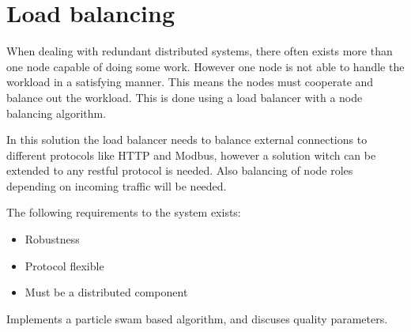 \chapter{Load balancing}

When dealing with redundant distributed systems, there often exists more than one node capable of doing some work.
However one node is not able to handle the workload in a satisfying manner.
This means the nodes must cooperate and balance out the workload.
This is done using a load balancer with a node balancing algorithm.

In this solution the load balancer needs to balance external connections to different protocols like HTTP and Modbus, however a solution witch can be extended to any restful protocol is needed. Also balancing of node roles depending on incoming traffic will be needed.


The following requirements to the system exists:
\begin{itemize}
	\item Robustness
	\item Protocol flexible
	\item Must be a distributed component
\end{itemize}


\cite{Ludwig:SwarmIntelligenceGridLoadBalancing} Implements a particle swam based algorithm, and discuses quality parameters.